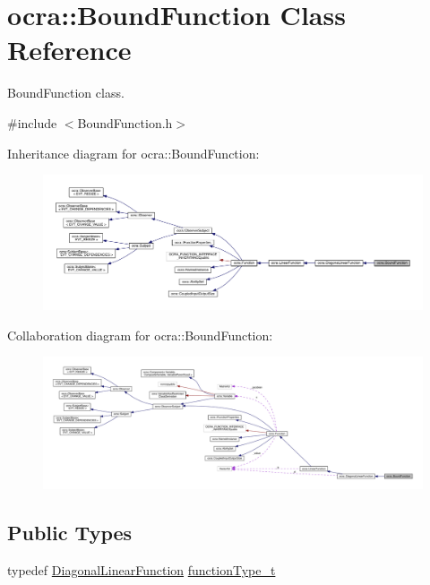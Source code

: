 \hypertarget{classocra_1_1BoundFunction}{}\section{ocra\+:\+:Bound\+Function Class Reference}
\label{classocra_1_1BoundFunction}


Bound\+Function class.  




{\ttfamily \#include $<$Bound\+Function.\+h$>$}



Inheritance diagram for ocra\+:\+:Bound\+Function\+:\nopagebreak
\begin{figure}[H]
\begin{center}
\leavevmode
\includegraphics[width=350pt]{d3/ddd/classocra_1_1BoundFunction__inherit__graph}
\end{center}
\end{figure}


Collaboration diagram for ocra\+:\+:Bound\+Function\+:\nopagebreak
\begin{figure}[H]
\begin{center}
\leavevmode
\includegraphics[width=350pt]{df/d41/classocra_1_1BoundFunction__coll__graph}
\end{center}
\end{figure}
\subsection*{Public Types}
\begin{DoxyCompactItemize}
\item 
typedef \hyperlink{classocra_1_1DiagonalLinearFunction}{Diagonal\+Linear\+Function} \hyperlink{classocra_1_1BoundFunction_acba2ac4d2f6caf04054590615a41ac21}{function\+Type\+\_\+t}
\end{DoxyCompactItemize}
